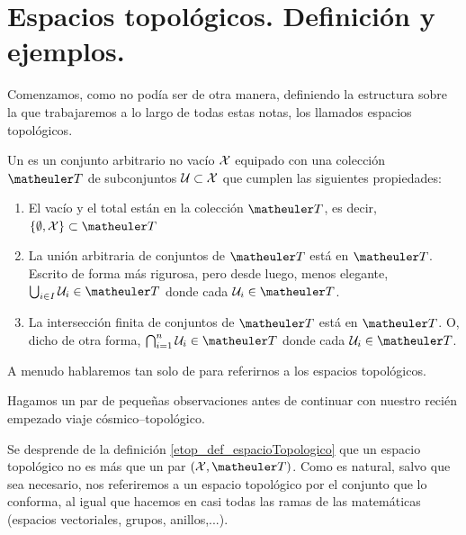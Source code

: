 \section{Espacios topológicos. Definición y ejemplos.}
\label{etop_definicionEjemplos}
Comenzamos, como no podía ser de otra manera, definiendo la estructura sobre la que trabajaremos a lo largo de todas estas notas, los llamados espacios topológicos.
\begin{defi}[Espacio topológico]
	\label{etop_def_espacioTopologico}
	Un  es un conjunto arbitrario no vacío $\mathcal{X}$ equipado con una colección $\T$ de subconjuntos $\mathcal{U}\subset\mathcal{X}$ que cumplen las siguientes propiedades:
	\begin{enumerate}
		\item El vacío y el total están en la colección $\T$, es decir, $\{\emptyset, \X\} \subset \T$
		\item La unión arbitraria de conjuntos de $\T$ está en $\T$. Escrito de forma más rigurosa, pero desde luego, menos elegante, 
		$\bigcup_{i\in I}\U_i\in\T$ donde cada $\U_i\in\T$.
		\item La intersección finita de conjuntos de $\T$ está en $\T$. O, dicho de otra forma, $\bigcap_{i=1}^{n}\U_i\in\T$ donde cada $\U_i\in\T$.
	\end{enumerate}
	A menudo hablaremos tan solo de  para referirnos a los espacios topológicos.
\end{defi}
Hagamos un par de pequeñas observaciones antes de continuar con nuestro recién empezado viaje cósmico--topológico.
\begin{obs}[Sutilezas]
	\label{etop_obs_sutilezas}
	Se desprende de la definición \ref{etop_def_espacioTopologico} que un espacio topológico no es más que un par $(\X, \T)$. Como es natural, salvo que sea necesario, nos referiremos a un espacio topológico por el conjunto que lo conforma, al igual que hacemos en casi todas las ramas de las matemáticas (espacios vectoriales, grupos, anillos,...).
\end{obs}
